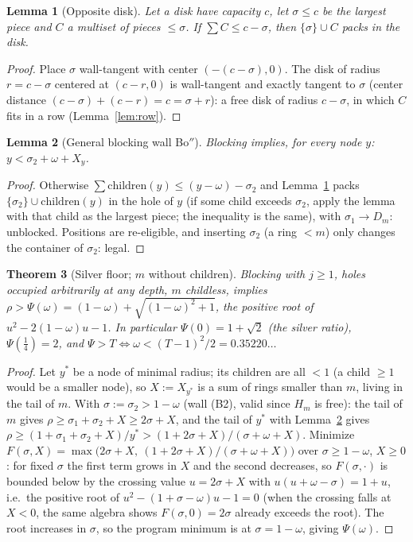 \documentclass[11pt]{article}
\newtheorem{theorem}{Theorem}
\newtheorem{lemma}[theorem]{Lemma}
\theoremstyle{definition}
\begin{document}
\begin{lemma}[Opposite disk]\label{lem:DR}
Let a disk have capacity $c$, let $\sigma\le c$ be the largest piece and
$C$ a multiset of pieces $\le\sigma$. If $\sum C\le c-\sigma$, then
$\{\sigma\}\cup C$ packs in the disk.
\end{lemma}
\begin{proof}
Place $\sigma$ wall-tangent with center $(-(c-\sigma),0)$. The disk of
radius $r=c-\sigma$ centered at $(c-r,0)$ is wall-tangent and exactly
tangent to $\sigma$ (center distance $(c-\sigma)+(c-r)=c=\sigma+r$): a
free disk of radius $c-\sigma$, in which $C$ fits in a row
(Lemma~\ref{lem:row}).
\end{proof}

\begin{lemma}[General blocking wall Bo$''$]\label{lem:DBo}
Blocking implies, for every node $y$: $y<\sigma_2+\omega+X_y$.
\end{lemma}
\begin{proof}
Otherwise $\sum\mathrm{children}(y)\le(y-\omega)-\sigma_2$ and
Lemma~\ref{lem:DR} packs $\{\sigma_2\}\cup\mathrm{children}(y)$ in the
hole of $y$ (if some child exceeds $\sigma_2$, apply the lemma with that
child as the largest piece; the inequality is the same), with
$\sigma_1\to D_m$: unblocked. Positions are re-eligible, and inserting
$\sigma_2$ (a ring $<m$) only changes the container of $\sigma_2$: legal.
\end{proof}

\begin{theorem}[Silver floor; $m$ without children]\label{thm:DB}
Blocking with $j\ge1$, holes occupied arbitrarily at any depth, $m$
childless, implies
$\rho>\Psi(\omega)=(1-\omega)+\sqrt{(1-\omega)^2+1}$, the positive root of
$u^2-2(1-\omega)u-1$. In particular $\Psi(0)=1+\sqrt2$ (the silver ratio),
$\Psi(\tfrac14)=2$, and $\Psi>T\iff\omega<(T-1)^2/2=0.35220\dots$
\end{theorem}
\begin{proof}
Let $y^*$ be a node of minimal radius; its children are all $<1$ (a child
$\ge1$ would be a smaller node), so $X:=X_{y^*}$ is a sum of rings smaller
than $m$, living in the tail of $m$. With $\sigma:=\sigma_2>1-\omega$
(wall (B2), valid since $H_m$ is free): the tail of $m$ gives
$\rho\ge\sigma_1+\sigma_2+X\ge2\sigma+X$, and the tail of $y^*$ with
Lemma~\ref{lem:DBo} gives
$\rho\ge(1+\sigma_1+\sigma_2+X)/y^*>(1+2\sigma+X)/(\sigma+\omega+X)$.
Minimize $F(\sigma,X)=\max\bigl(2\sigma+X,\
(1+2\sigma+X)/(\sigma+\omega+X)\bigr)$ over $\sigma\ge1-\omega$, $X\ge0$:
for fixed $\sigma$ the first term grows in $X$ and the second decreases,
so $F(\sigma,\cdot)$ is bounded below by the crossing value
$u=2\sigma+X$ with $u(u+\omega-\sigma)=1+u$, i.e.\ the positive root of
$u^2-(1+\sigma-\omega)u-1=0$ (when the crossing falls at $X<0$, the same
algebra shows $F(\sigma,0)=2\sigma$ already exceeds the root). The root
increases in $\sigma$, so the program minimum is at $\sigma=1-\omega$,
giving $\Psi(\omega)$.
\end{proof}
\end{document}
